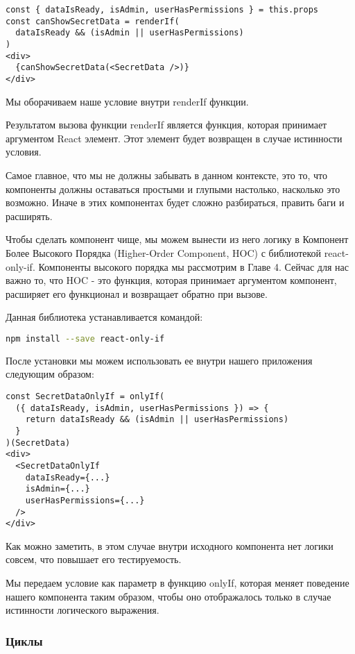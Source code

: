 \begin{lstlisting}
const { dataIsReady, isAdmin, userHasPermissions } = this.props
const canShowSecretData = renderIf(
  dataIsReady && (isAdmin || userHasPermissions)
)
<div>
  {canShowSecretData(<SecretData />)}
</div>
\end{lstlisting}


Мы оборачиваем наше условие внутри renderIf функции.

Результатом вызова функции renderIf является функция, которая принимает аргументом React элемент. Этот элемент будет возвращен в случае истинности условия.

Самое главное, что мы не должны забывать в данном контексте, это то, что компоненты должны оставаться простыми и глупыми настолько, насколько это возможно. Иначе в этих компонентах будет сложно разбираться, править баги и расширять.

Чтобы сделать компонент чище, мы можем вынести из него логику в Компонент Более Высокого Порядка (Higher-Order Component, HOC) с библиотекой react-only-if. Компоненты высокого порядка мы рассмотрим  в Главе 4. Сейчас для нас важно то, что HOC - это функция, которая принимает аргументом компонент, расширяет его функционал и возвращает обратно при вызове.

Данная библиотека устанавливается командой:

\begin{lstlisting}[language=bash]
npm install --save react-only-if
\end{lstlisting}

После установки мы можем использовать ее внутри нашего приложения следующим образом:

\begin{lstlisting}
const SecretDataOnlyIf = onlyIf(
  ({ dataIsReady, isAdmin, userHasPermissions }) => {
    return dataIsReady && (isAdmin || userHasPermissions)
  }
)(SecretData)
<div>
  <SecretDataOnlyIf
    dataIsReady={...}
    isAdmin={...}
    userHasPermissions={...}
  /> 
</div>
\end{lstlisting}

Как можно заметить, в этом случае внутри исходного компонента нет логики совсем, что повышает его тестируемость.

Мы передаем условие как параметр в функцию onlyIf, которая меняет поведение нашего компонента таким образом, чтобы оно отображалось только в случае истинности логического выражения.

\subsubsection{Циклы}

